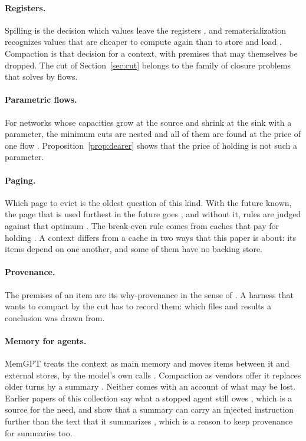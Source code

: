 \documentclass[acmsmall,nonacm,screen]{acmart}
\begin{document}
\paragraph{Registers.} Spilling is the decision which values leave the registers
\citep{Chaitin1982}, and rematerialization recognizes values that are cheaper to compute
again than to store and load \citep{Briggs1992}. Compaction is that decision for a context,
with premises that may themselves be dropped. The cut of Section~\ref{sec:cut} belongs to the
family of closure problems that \citet{Picard1976} solves by flows.

\paragraph{Parametric flows.} For networks whose capacities grow at the source and shrink at
the sink with a parameter, the minimum cuts are nested and all of them are found at the
price of one flow \citep{Gallo1989}. Proposition~\ref{prop:dearer} shows that the price of
holding is not such a parameter.

\paragraph{Paging.} Which page to evict is the oldest question of this kind. With the future
known, the page that is used furthest in the future goes \citep{Belady1966}, and without it,
rules are judged against that optimum \citep{SleatorTarjan1985}. The break-even rule comes
from caches that pay for holding \citep{Karlin1988}. A context differs from a cache in two
ways that this paper is about: its items depend on one another, and some of them have no
backing store.

\paragraph{Provenance.} The premises of an item are its why-provenance in the sense of
\citet{Buneman2001}. A harness that wants to compact by the cut has to record them: which
files and results a conclusion was drawn from.

\paragraph{Memory for agents.} MemGPT treats the context as main memory and moves items
between it and external stores, by the model's own calls \citep{Packer2023}. Compaction as
vendors offer it replaces older turns by a summary \citep{claudecompaction}. Neither comes
with an account of what may be lost. Earlier papers of this collection say what a stopped
agent still owes \citep{tpp12}, which is a source for the need, and show that a summary can
carry an injected instruction further than the text that it summarizes \citep{tpp14}, which
is a reason to keep provenance for summaries too.
\end{document}

